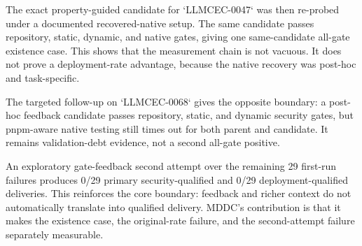 ﻿\documentclass[lettersize,journal]{IEEEtran}
\begin{document}
The exact property-guided candidate for `LLMCEC-0047` was then re-probed under a documented recovered-native setup. The same candidate passes repository, static, dynamic, and native gates, giving one same-candidate all-gate existence case. This shows that the measurement chain is not vacuous. It does not prove a deployment-rate advantage, because the native recovery was post-hoc and task-specific.

The targeted follow-up on `LLMCEC-0068` gives the opposite boundary: a post-hoc feedback candidate passes repository, static, and dynamic security gates, but pnpm-aware native testing still times out for both parent and candidate. It remains validation-debt evidence, not a second all-gate positive.

An exploratory gate-feedback second attempt over the remaining 29 first-run failures produces 0/29 primary security-qualified and 0/29 deployment-qualified deliveries. This reinforces the core boundary: feedback and richer context do not automatically translate into qualified delivery. MDDC's contribution is that it makes the existence case, the original-rate failure, and the second-attempt failure separately measurable.
\end{document}

